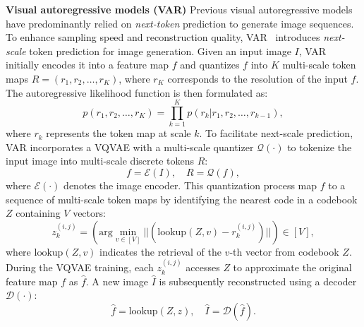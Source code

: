 \noindent\textbf{Visual autoregressive models (VAR)}
Previous visual autoregressive models~\cite{vqgan,DBLP:conf/cvpr/LeeKKCH22,DBLP:conf/iclr/YuLKZPQKXBW22} have predominantly relied on \textit{next-token} prediction to generate image sequences. To enhance sampling speed and reconstruction quality, VAR~\cite{var} introduces \textit{next-scale} token prediction for image generation.  Given an input image $I$, VAR initially encodes it into a feature map $f$ and quantizes $f$ into $K$ multi-scale token maps $R = \left(r_1, r_2, \ldots , r_K\right)$, where $r_K$ corresponds to the resolution of the input $f$. The autoregressive likelihood function is then formulated as:
\begin{equation}
    p\left(r_1, r_2, \ldots , r_K\right) = \prod_{k = 1}^K p\left(r_k|r_1, r_2, \ldots , r_{k-1}\right),
\end{equation}
where $r_k$ represents the token map at scale $k$. To facilitate next-scale prediction, VAR incorporates a VQVAE with a multi-scale quantizer $\mathcal{Q}(\cdot)$ to tokenize the input image into multi-scale discrete tokens $R$:
\begin{equation}
    f = \mathcal{E}(I), \mathrm{\quad} R = \mathcal{Q}(f),
\end{equation}
where $\mathcal{E}(\cdot)$ denotes the image encoder.
This quantization process map $f$ to a sequence of multi-scale token maps by identifying the nearest code in a codebook $Z$ containing $V$ vectors:
\begin{equation}
    z_k^{(i,j)} = (\mathrm{arg}\min_{v \in [V]} ||(\mathrm{lookup}(Z, v) - r_k^{(i,j)})|| ) \in [V],
\end{equation}
where $\mathrm{lookup}(Z, v)$ indicates the retrieval of the $v$-th vector from codebook $Z$. During the VQVAE training, each $z_k^{(i,j)}$ accesses $Z$ to approximate the original feature map $f$ as $\hat{f}$. A new image $\hat{I}$ is subsequently reconstructed using a decoder $\mathcal{D}(\cdot)$:
\begin{equation}
    \hat{f} = \mathrm{lookup}(Z, z), \mathrm{\quad} \hat{I} = \mathcal{D}(\hat{f}).
\end{equation}

